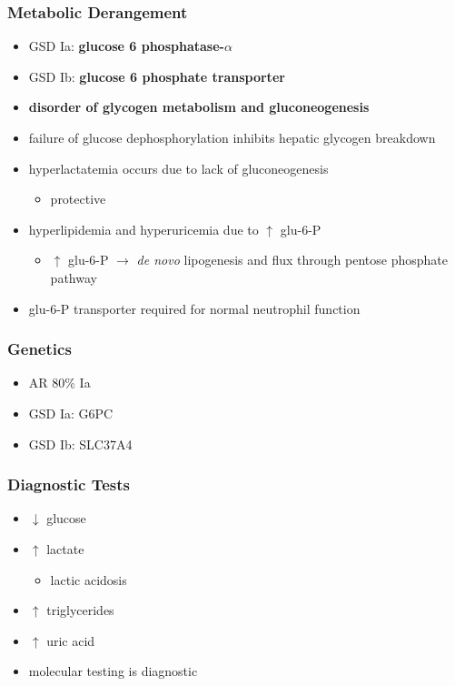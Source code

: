 \documentclass[12pt]{scrartcl}
\begin{document}
\subsubsection{Metabolic Derangement}
\label{sec:org46886d6}
\begin{itemize}
\item GSD Ia: \textbf{glucose 6 phosphatase-\(\alpha\)}
\item GSD Ib: \textbf{glucose 6 phosphate transporter}
\item \textbf{disorder of glycogen metabolism and gluconeogenesis}
\item failure of glucose dephosphorylation inhibits hepatic glycogen breakdown
\item hyperlactatemia occurs due to lack of gluconeogenesis
\begin{itemize}
\item protective
\end{itemize}
\item hyperlipidemia and hyperuricemia due to \(\uparrow\) glu-6-P
\begin{itemize}
\item \(\uparrow\) glu-6-P \(\to\) \emph{de novo} lipogenesis and flux through pentose phosphate pathway
\end{itemize}
\item glu-6-P transporter required for normal neutrophil function
\end{itemize}

\subsubsection{Genetics}
\label{sec:orge99b86c}
\begin{itemize}
\item AR 80\% Ia
\item GSD Ia: G6PC
\item GSD Ib: SLC37A4
\end{itemize}

\subsubsection{Diagnostic Tests}
\label{sec:orgcb8798c}
\begin{itemize}
\item \(\downarrow\) glucose
\item \(\uparrow\) lactate
\begin{itemize}
\item lactic acidosis
\end{itemize}
\item \(\uparrow\) triglycerides
\item \(\uparrow\) uric acid
\item molecular testing is diagnostic
\end{itemize}
\end{document}
